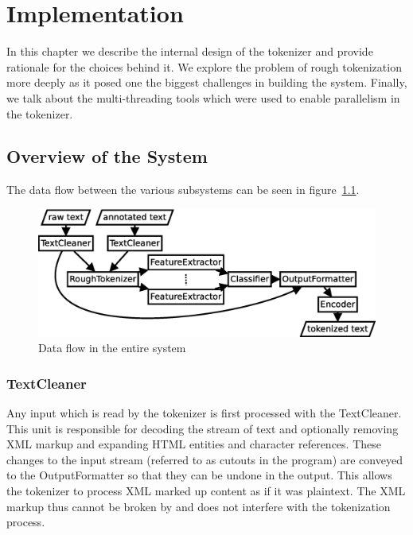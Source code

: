 \chapter{Implementation}
\label{chap:impl}

In this chapter we describe the internal design of the tokenizer and provide
rationale for the choices behind it. We explore the problem of rough
tokenization more deeply as it posed one the biggest challenges in building the
system. Finally, we talk about the multi-threading tools which were used to
enable parallelism in the tokenizer.

\section{Overview of the System}
\label{sec:impl-overview}

The data flow between the various subsystems can be seen in
figure~\ref{fig:all-parts}.

\begin{figure}[ht]
  \includegraphics[width=\textwidth]{img/all-parts.eps}
  \caption{Data flow in the entire system}
  \label{fig:all-parts}
\end{figure}

\subsection{TextCleaner}

Any input which is read by the tokenizer is first processed with the
TextCleaner. This unit is responsible for decoding the stream of text and
optionally removing XML markup and expanding HTML entities and character
references. These changes to the input stream (referred to as cutouts in the
program) are conveyed to the OutputFormatter so that they can be undone in the
output. This allows the tokenizer to process XML marked up content as if it was
plaintext. The XML markup thus cannot be broken by and does not interfere with
the tokenization process.

